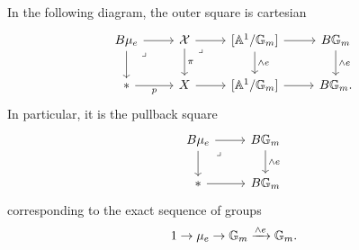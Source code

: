 \begin{thm}\cite[Theorem 1.1.36]{Taams}
In the following diagram, the outer square is cartesian
\[\begin{tikzcd}
	{B\mu_e} & \Xc & {[\Ab^1/\Gb_m]} & {B\Gb_m} \\
	{*} & X & {[\Ab^1/\Gb_m]} & {B\Gb_m.}
	\arrow[from=1-1, to=1-2]
	\arrow[from=1-1, to=2-1]
	\arrow["\lrcorner"{anchor=center, pos=0.125}, draw=none, from=1-1, to=2-2]
	\arrow[from=1-2, to=1-3]
	\arrow["\pi", from=1-2, to=2-2]
	\arrow["\lrcorner"{anchor=center, pos=0.125}, draw=none, from=1-2, to=2-3]
	\arrow[from=1-3, to=1-4]
	\arrow["{\wedge e}", from=1-3, to=2-3]
	\arrow["{\wedge e}", from=1-4, to=2-4]
	\arrow["p"', from=2-1, to=2-2]
	\arrow[from=2-2, to=2-3]
	\arrow[from=2-3, to=2-4]
\end{tikzcd}\]
In particular, it is the pullback square
\[\begin{tikzcd}
	{B\mu_e} & {B\Gb_m} \\
	{*} & {B\Gb_m}
	\arrow[from=1-1, to=1-2]
	\arrow[from=1-1, to=2-1]
	\arrow["\lrcorner"{anchor=center, pos=0.125}, draw=none, from=1-1, to=2-2]
	\arrow["{\wedge e}", from=1-2, to=2-2]
	\arrow[from=2-1, to=2-2]
\end{tikzcd}\]
corresponding to the exact sequence of groups
\[
1 \to \mu_e \to \mathbb{G}_m \xrightarrow{\wedge e} \mathbb{G}_m.
\]
\end{thm}
